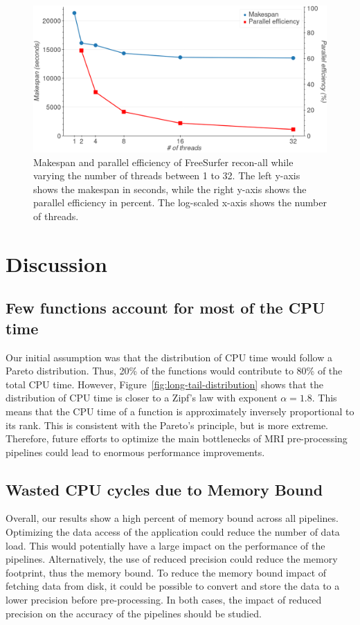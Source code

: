 \documentclass[conference]{IEEEtran}
\begin{document}
\begin{figure}
	\includegraphics[width=\linewidth]{figures/makespan-freesurfer.png}
	\caption{Makespan and parallel efficiency of FreeSurfer recon-all while varying the number of threads between 1 to 32. The left y-axis shows the makespan in seconds, while the right y-axis shows the parallel efficiency in percent. The log-scaled x-axis shows the number of threads.}
	\label{fig:freesurfer-threading}
\end{figure}
					
\section{Discussion}
\subsection{Few functions account for most of the CPU time}
Our initial assumption was that the distribution of CPU time would follow a Pareto distribution. Thus, 20\% of the functions would contribute to 80\% of the total CPU time. However, Figure~\ref{fig:long-tail-distribution} shows that the distribution of CPU time is closer to a Zipf's law with exponent $\alpha=1.8$. This means that the CPU time of a function is approximately inversely proportional to its rank. This is consistent with the Pareto's principle, but is more extreme. Therefore, future efforts to optimize the main bottlenecks of MRI pre-processing pipelines could lead to enormous performance improvements.

\subsection{Wasted CPU cycles due to Memory Bound}
Overall, our results show a high percent of memory bound across all pipelines.
Optimizing the data access of the application could reduce the number of data load. This would potentially have a large impact on the performance of the pipelines. Alternatively, the use of reduced precision could reduce the memory footprint, thus the memory bound. To reduce the memory bound impact of fetching data from disk, it could be possible to convert and store the data to a lower precision before pre-processing. In both cases, the impact of reduced precision on the accuracy of the pipelines should be studied.
\end{document}
